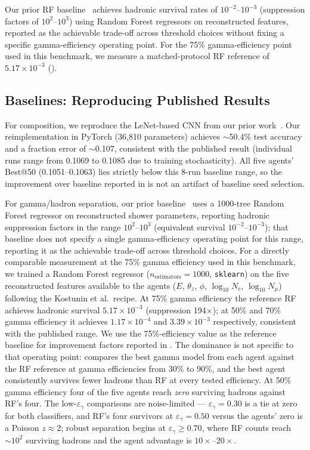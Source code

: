 \documentclass[universe,article,submit,pdftex,oneauthor]{Definitions/mdpi}
\begin{document}
Our prior RF baseline~\cite{kascade_icrc} achieves hadronic survival rates of $10^{-2}$--$10^{-3}$ (suppression factors of $10^2$--$10^3$) using Random Forest regressors on reconstructed features, reported as the achievable trade-off across threshold choices without fixing a specific gamma-efficiency operating point. For the 75\% gamma-efficiency point used in this benchmark, we measure a matched-protocol RF reference of $5.17 \times 10^{-3}$ ().

\subsection{Baselines: Reproducing Published Results}
\label{sec:baselines}

For composition, we reproduce the LeNet-based CNN from our prior work~\cite{kascade_jinst}. Our reimplementation in PyTorch (36{,}810 parameters) achieves $\sim$50.4\% test accuracy and a fraction error of $\sim$0.107, consistent with the published result (individual runs range from 0.1069 to 0.1085 due to training stochasticity). All five agents' Best@50 (0.1051--0.1063) lies strictly below this 8-run baseline range, so the improvement over baseline reported in  is not an artifact of baseline seed selection.

For gamma/hadron separation, our prior baseline~\cite{kascade_icrc} uses a 1000-tree Random Forest regressor on reconstructed shower parameters, reporting hadronic suppression factors in the range $10^2$--$10^3$ (equivalent survival $10^{-2}$--$10^{-3}$); that baseline does not specify a single gamma-efficiency operating point for this range, reporting it as the achievable trade-off across threshold choices. For a directly comparable measurement at the 75\% gamma efficiency used in this benchmark, we trained a Random Forest regressor ($n_\mathrm{estimators}=1000$, \texttt{sklearn}) on the five reconstructed features available to the agents ($E$, $\theta_z$, $\phi$, $\log_{10} N_e$, $\log_{10} N_\mu$) following the Kostunin et al.\ recipe. At 75\% gamma efficiency the reference RF achieves hadronic survival $5.17 \times 10^{-3}$ (suppression 194$\times$); at 50\% and 70\% gamma efficiency it achieves $1.17 \times 10^{-4}$ and $3.39 \times 10^{-3}$ respectively, consistent with the published range. We use the 75\%-efficiency value as the reference baseline for improvement factors reported in . The dominance is not specific to that operating point:  compares the best gamma model from each agent against the RF reference at gamma efficiencies from 30\% to 90\%, and the best agent consistently survives fewer hadrons than RF at every tested efficiency. At 50\% gamma efficiency four of the five agents reach \emph{zero} surviving hadrons against RF's four. The low-$\varepsilon_\gamma$ comparisons are noise-limited --- $\varepsilon_\gamma = 0.30$ is a tie at zero for both classifiers, and RF's four survivors at $\varepsilon_\gamma = 0.50$ versus the agents' zero is a Poisson $z \approx 2$; robust separation begins at $\varepsilon_\gamma \geq 0.70$, where RF counts reach ${\sim}10^2$ surviving hadrons and the agent advantage is $10\times$--$20\times$.
\end{document}
